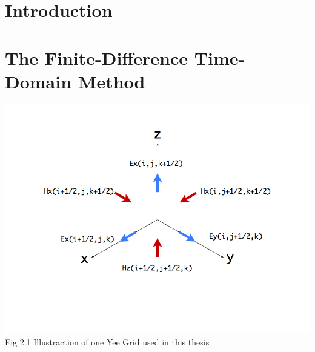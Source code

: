 \documentclass[openany]{book}
\begin{document}
\fontsize{12}{2.0em}\selectfont


\frontmatter




\tableofcontents





\mainmatter

\chapter{Introduction}




\chapter{The Finite-Difference Time-Domain Method}





\clearpage
\begin{center}
\includegraphics[scale=0.5]{images/yee-grid.jpg}\\
Fig 2.1
Illustraction of one Yee Grid used in this thesis
\end{center}
\end{document}
